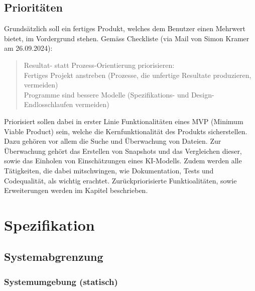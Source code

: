 \documentclass[a4paper,12pt]{report}
\begin{document}
    \section{Prioritäten}
    Grundsätzlich soll ein fertiges Produkt, welches dem Benutzer einen Mehrwert bietet, im Vordergrund stehen.
    Gemäss Checkliste (via Mail von Simon Kramer am 26.09.2024):
    \begin{quote}
        Resultat- statt Prozess-Orientierung priorisieren:
        \\Fertiges Projekt anstreben (Prozesse, die unfertige Resultate produzieren, vermeiden)
        \\Programme sind bessere Modelle (Spezifikations- und Design-Endlosschlaufen vermeiden)
    \end{quote}

    Priorisiert sollen dabei in erster Linie Funktionalitäten eines MVP (Minimum Viable Product) sein, welche die Kernfunktionalität des Produkts sicherstellen.
    Dazu gehören vor allem die Suche und Überwachung von Dateien.
    Zur Überwachung gehört das Erstellen von Snapshots und das Vergleichen dieser, sowie das Einholen von Einschätzungen eines KI-Modells.
    Zudem werden alle Tätigkeiten, die dabei mitschwingen, wie Dokumentation, Tests und Codequalität, als wichtig erachtet.
    Zurückpriorisierte Funktioalitäten, sowie Erweiterungen werden im Kapitel  beschrieben.


    \chapter{Spezifikation}


    \section{Systemabgrenzung}

    \subsection{Systemumgebung (statisch)}
\end{document}
